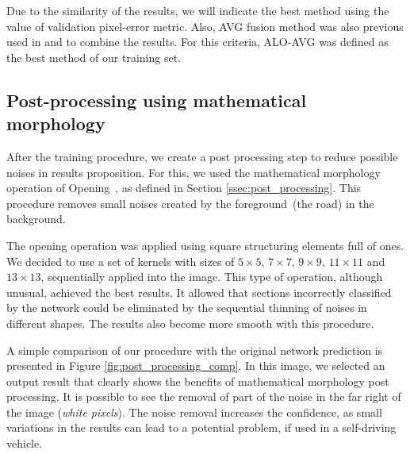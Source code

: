 Due to the similarity of the results, we will indicate the best method using the value of validation pixel-error metric. Also, AVG fusion method was also previous used in \cite{xie2015} and \cite{liu2017} to combine the results. For this criteria, ALO-AVG was defined as the best method of our training set.

\subsection{Post-processing using mathematical morphology}

 

After the training procedure, we create a post processing step to reduce possible noises in results proposition. For this, we used the mathematical morphology operation of Opening~\cite{najman13}, as defined in Section \ref{ssec:post_processing}. This procedure removes small noises created by the foreground~(the road) in the background. 

The opening operation was applied using square structuring elements full of ones. We decided to use a set of kernels with sizes of $5\times5$, $7\times7$, $9\times9$, $11\times11$ and $13\times13$, sequentially applied into the image. This type of operation, although unusual, achieved the best results. It allowed that sections incorrectly classified by the network could be eliminated by the sequential thinning of noises in different shapes. The results also become more smooth with this procedure.

 

A simple comparison of our procedure with the original network prediction is presented in Figure \ref{fig:post_processing_comp}. In this image, we selected an output result that clearly shows the benefits of mathematical morphology post processing. It is possible to see the removal of part of the noise in the far right of the image (\textit{white pixels}). The noise removal increases the confidence, as small variations in the results can lead to a potential problem, if used in a self-driving vehicle. 

